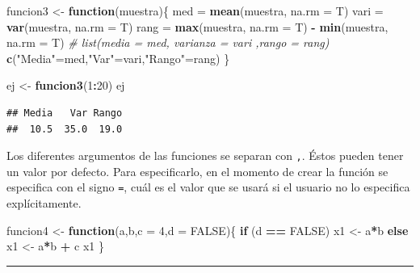\documentclass[]{book}
\newenvironment{Shaded}{\begin{snugshade}}{\end{snugshade}}
\newcommand{\KeywordTok}[1]{\textcolor[rgb]{0.13,0.29,0.53}{\textbf{#1}}}
\newcommand{\DataTypeTok}[1]{\textcolor[rgb]{0.13,0.29,0.53}{#1}}
\newcommand{\DecValTok}[1]{\textcolor[rgb]{0.00,0.00,0.81}{#1}}
\newcommand{\StringTok}[1]{\textcolor[rgb]{0.31,0.60,0.02}{#1}}
\newcommand{\CommentTok}[1]{\textcolor[rgb]{0.56,0.35,0.01}{\textit{#1}}}
\newcommand{\OtherTok}[1]{\textcolor[rgb]{0.56,0.35,0.01}{#1}}
\newcommand{\ControlFlowTok}[1]{\textcolor[rgb]{0.13,0.29,0.53}{\textbf{#1}}}
\newcommand{\OperatorTok}[1]{\textcolor[rgb]{0.81,0.36,0.00}{\textbf{#1}}}
\newcommand{\NormalTok}[1]{#1}
\begin{document}
\begin{Shaded}
\begin{Highlighting}[]
\NormalTok{funcion3 <-}\StringTok{ }\ControlFlowTok{function}\NormalTok{(muestra)\{     }
\NormalTok{  med =}\StringTok{ }\KeywordTok{mean}\NormalTok{(muestra, }\DataTypeTok{na.rm =}\NormalTok{ T)}
\NormalTok{  vari =}\StringTok{ }\KeywordTok{var}\NormalTok{(muestra, }\DataTypeTok{na.rm =}\NormalTok{ T)}
\NormalTok{  rang =}\StringTok{ }\KeywordTok{max}\NormalTok{(muestra, }\DataTypeTok{na.rm =}\NormalTok{ T) }\OperatorTok{-}\StringTok{ }\KeywordTok{min}\NormalTok{(muestra, }\DataTypeTok{na.rm =}\NormalTok{ T)}
  \CommentTok{# list(media = med, varianza = vari ,rango = rang)}
  \KeywordTok{c}\NormalTok{(}\StringTok{"Media"}\NormalTok{=med,}\StringTok{"Var"}\NormalTok{=vari,}\StringTok{"Rango"}\NormalTok{=rang)}
\NormalTok{\}}

\NormalTok{ej <-}\StringTok{ }\KeywordTok{funcion3}\NormalTok{(}\DecValTok{1}\OperatorTok{:}\DecValTok{20}\NormalTok{)}
\NormalTok{ej}
\end{Highlighting}
\end{Shaded}

\begin{verbatim}
## Media   Var Rango 
##  10.5  35.0  19.0
\end{verbatim}

Los diferentes argumentos de las funciones se separan con \texttt{,}.
Éstos pueden tener un valor por defecto. Para especificarlo, en el
momento de crear la función se especifica con el signo \texttt{=}, cuál
es el valor que se usará si el usuario no lo especifica explícitamente.

\begin{Shaded}
\begin{Highlighting}[]
\NormalTok{funcion4 <-}\StringTok{ }\ControlFlowTok{function}\NormalTok{(a,b,}\DataTypeTok{c =} \DecValTok{4}\NormalTok{,}\DataTypeTok{d =} \OtherTok{FALSE}\NormalTok{)\{}
  \ControlFlowTok{if}\NormalTok{ (d }\OperatorTok{==}\StringTok{ }\OtherTok{FALSE}\NormalTok{) x1 <-}\StringTok{ }\NormalTok{a}\OperatorTok{*}\NormalTok{b }\ControlFlowTok{else}\NormalTok{ x1 <-}\StringTok{ }\NormalTok{a}\OperatorTok{*}\NormalTok{b }\OperatorTok{+}\StringTok{ }\NormalTok{c}
\NormalTok{  x1}
\NormalTok{\}}
\end{Highlighting}
\end{Shaded}

\begin{center}\rule{0.5\linewidth}{\linethickness}\end{center}
\end{document}
